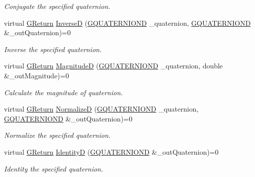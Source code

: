 \begin{DoxyCompactItemize}
\begin{DoxyCompactList}\small\item\em Conjugate the specified quaternion. \end{DoxyCompactList}\item 
virtual \mbox{\hyperlink{namespaceGW_a67a839e3df7ea8a5c5686613a7a3de21}{G\+Return}} \mbox{\hyperlink{classGW_1_1MATH_1_1GQuaternion_ac2203e68f46ae2ea0ccc185fe34c446e}{InverseD}} (\mbox{\hyperlink{structGW_1_1MATH_1_1GQUATERNIOND}{G\+Q\+U\+A\+T\+E\+R\+N\+I\+O\+ND}} \+\_\+quaternion, \mbox{\hyperlink{structGW_1_1MATH_1_1GQUATERNIOND}{G\+Q\+U\+A\+T\+E\+R\+N\+I\+O\+ND}} \&\+\_\+out\+Quaternion)=0
\begin{DoxyCompactList}\small\item\em Inverse the specified quaternion. \end{DoxyCompactList}\item 
virtual \mbox{\hyperlink{namespaceGW_a67a839e3df7ea8a5c5686613a7a3de21}{G\+Return}} \mbox{\hyperlink{classGW_1_1MATH_1_1GQuaternion_a4f7486a44ec31235fe98a5ac306b3595}{MagnitudeD}} (\mbox{\hyperlink{structGW_1_1MATH_1_1GQUATERNIOND}{G\+Q\+U\+A\+T\+E\+R\+N\+I\+O\+ND}} \+\_\+quaternion, double \&\+\_\+out\+Magnitude)=0
\begin{DoxyCompactList}\small\item\em Calculate the magnitude of quaternion. \end{DoxyCompactList}\item 
virtual \mbox{\hyperlink{namespaceGW_a67a839e3df7ea8a5c5686613a7a3de21}{G\+Return}} \mbox{\hyperlink{classGW_1_1MATH_1_1GQuaternion_aee972e9eadcb9656153e3a6b218e5aa9}{NormalizeD}} (\mbox{\hyperlink{structGW_1_1MATH_1_1GQUATERNIOND}{G\+Q\+U\+A\+T\+E\+R\+N\+I\+O\+ND}} \+\_\+quaternion, \mbox{\hyperlink{structGW_1_1MATH_1_1GQUATERNIOND}{G\+Q\+U\+A\+T\+E\+R\+N\+I\+O\+ND}} \&\+\_\+out\+Quaternion)=0
\begin{DoxyCompactList}\small\item\em Normalize the specified quaternion. \end{DoxyCompactList}\item 
virtual \mbox{\hyperlink{namespaceGW_a67a839e3df7ea8a5c5686613a7a3de21}{G\+Return}} \mbox{\hyperlink{classGW_1_1MATH_1_1GQuaternion_a794efffc63a56778e810246cfaabb692}{IdentityD}} (\mbox{\hyperlink{structGW_1_1MATH_1_1GQUATERNIOND}{G\+Q\+U\+A\+T\+E\+R\+N\+I\+O\+ND}} \&\+\_\+out\+Quaternion)=0
\begin{DoxyCompactList}\small\item\em Identity the specified quaternion. \end{DoxyCompactList}\item 

\end{DoxyCompactItemize}
